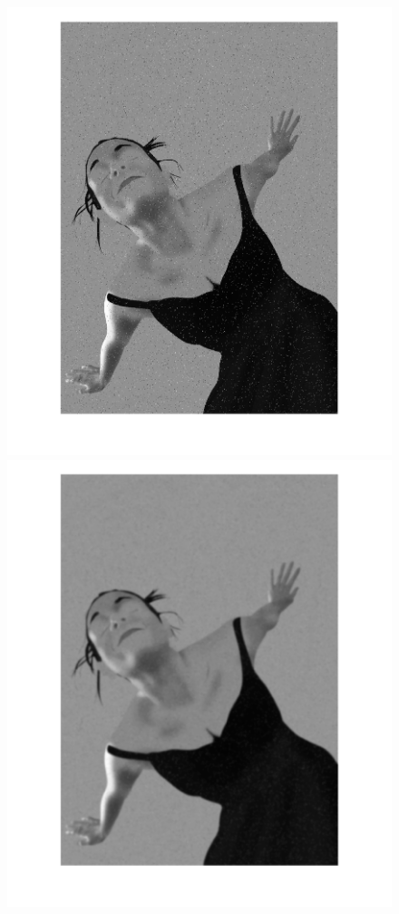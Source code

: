 \begin{figure}[htb] \centering
\includegraphics[scale=0.13,trim={6cm 0 4.5cm 0},clip]{Pictures/Esempi di utilizzo/Esempio 1/Amira_con_rumore.png}
\includegraphics[scale=0.13,trim={6cm 0 6cm 0},clip]{Pictures/Esempi di utilizzo/Esempio 1/Amira_diffusa.png}

\end{figure}
